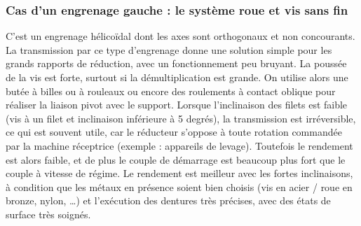 \documentclass[11pt,oneside]{article}
\begin{document}
\subsubsection{Cas d'un engrenage gauche : le système roue et vis sans fin}
\begin{minipage}[c]{.65\linewidth}
C’est un engrenage hélicoïdal dont les axes sont orthogonaux et non concourants.
La transmission par ce type d’engrenage donne une solution simple pour les grands rapports de réduction, avec un fonctionnement peu bruyant. La poussée de la vis est forte, surtout si la démultiplication est grande. On utilise alors une butée à billes ou à rouleaux ou encore des roulements à contact oblique pour réaliser la liaison pivot avec le support. Lorsque l’inclinaison des filets est faible (vis à un filet et inclinaison inférieure à 5 degrés), la transmission est irréversible, ce qui est souvent utile, car le réducteur s’oppose à toute rotation commandée par la machine réceptrice (exemple : appareils de levage).
Toutefois le rendement est alors faible, et de plus le couple de démarrage est beaucoup plus fort que le couple à vitesse de régime. Le rendement est meilleur avec les fortes inclinaisons, à condition que les métaux en présence soient bien choisis (vis en acier / roue en bronze, nylon, …) et l’exécution des dentures très précises, avec des états de surface très soignés.
\begin{center}
\end{center}
\end{minipage} \hfill
\end{document}
